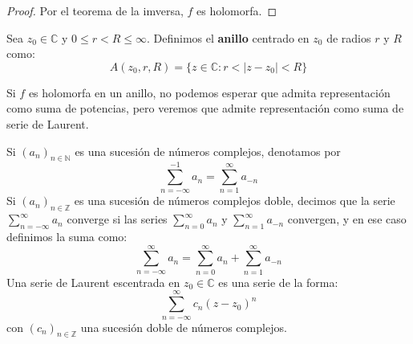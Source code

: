 \begin{proof}
    Por el teorema de la imversa, $f$ es holomorfa.
\end{proof}

\begin{definición} [Anillo]
    Sea $z_0 \in \mathbb{C}$ y $0 \leq r < R \leq \infty$. Definimos el \textbf{anillo} centrado en $z_0$ de radios $r$ y $R$ como:
    \[
        A(z_0, r, R) = \{ z \in \mathbb{C} : r < |z - z_0| < R \}
    \]
\end{definición}

Si $f$ es holomorfa en un anillo, no podemos esperar que admita representación como suma de potencias, pero veremos que admite representación como suma de serie de Laurent.


Si $(a_n)_{n \in \mathbb{N}}$ es una sucesión de números complejos, denotamos por 
\[
        \sum_{n=-\infty}^{-1} a_n = \sum_{n=1}^{\infty} a_{-n}
\]
Si $(a_n)_{n \in \mathbb{Z}}$ es una sucesión de números complejos doble, decimos que la serie $\sum_{n=-\infty}^{\infty} a_n$ converge si las series $\sum_{n=0}^{\infty} a_n$ y $\sum_{n=1}^{\infty} a_{-n}$ convergen, y en ese caso definimos la suma como:
\[
        \sum_{n=-\infty}^{\infty} a_n = \sum_{n=0}^{\infty} a_n + \sum_{n=1}^{\infty} a_{-n}
\]
Una serie de Laurent escentrada en $z_0 \in \mathbb{C}$ es una serie de la forma:
\[
        \sum_{n=-\infty}^{\infty} c_n (z - z_0)^n
\]
con $(c_n)_{n \in \mathbb{Z}}$ una sucesión doble de números complejos.

